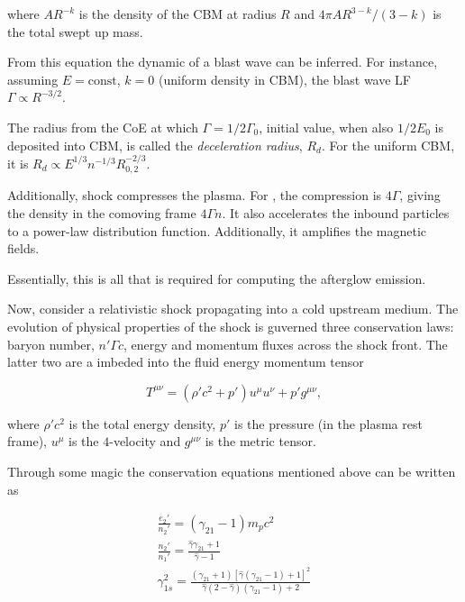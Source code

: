 where $AR^{-k}$ is the density of the \ac{CBM} at radius $R$ and $4\pi A R^{3-k}/ (3-k)$ is the total swept up mass.

From this equation the dynamic of a blast wave can be inferred. For instance, assuming $E=\text{const}$, $k=0$ (uniform density in \ac{CBM}), the blast wave \ac{LF} $\Gamma\propto R^{-3/2}$.

The radius from the \ac{CoE} at which $\Gamma = 1/2 \Gamma_0$, initial value, when also $1/2 E_0$ is deposited into \ac{CBM}, is called the \textit{deceleration radius}, $R_d$. 
For the uniform \ac{CBM}, it is $R_d\propto E^{1/3} n^{-1/3} R_{0,2}^{-2/3}$.

Additionally, shock compresses the plasma. For , the compression is $4\Gamma$, giving the density in the comoving frame $4 \Gamma n$.
It also accelerates the inbound particles to a power-law distribution function. 
Additionally, it amplifies the magnetic fields. 

Essentially, this is all that is required for computing the afterglow emission.


Now, consider a relativistic shock propagating into a cold upstream medium.
The evolution of physical properties of the shock is guverned three conservation laws: baryon number, $n' \Gamma c$, energy and momentum fluxes across the shock front. The latter two are a imbeded into the fluid energy momentum tensor 

\begin{equation}
T^{\mu\nu} = (\rho' c^2 + p') u^{\mu} u^{\nu} + p' g^{\mu\nu},
\end{equation}

where $\rho' c^2$ is the total energy density, $p'$ is the pressure (in the plasma rest frame), $u^{\mu}$ is the $4$-velocity and $g^{\mu\nu}$ is the metric tensor.

Through some magic the conservation equations mentioned above can be written as \citep{Blandford:1976,Rezzolla:2013} 

\begin{eqnarray}
\frac{e_2'}{n_2'} = (\gamma_{21} - 1)m_p c^2 \\
\frac{n_2'}{n_1'} = \frac{\hat{\gamma}\gamma_{21} + 1}{\hat{\gamma}-1} \\
\gamma_{1s}^2 = \frac{(\gamma_{21} + 1) [\hat{\gamma}(\gamma_{21}-1)+1]^2}{\hat{\gamma}(2-\hat{\gamma})(\gamma_{21}-1)+2}
\end{eqnarray}

